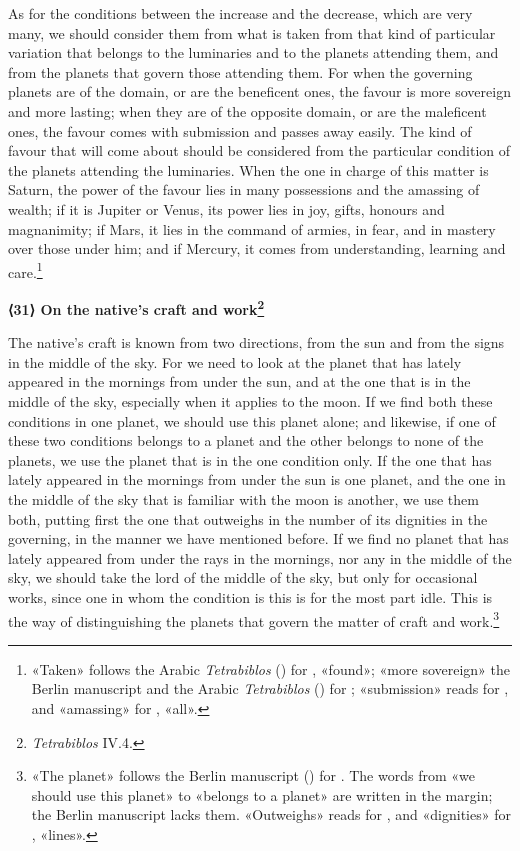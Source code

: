\documentclass[11pt]{article}
\newcommand{\Fol}[1]{\marginpar{\footnotesize\color{gray}f.\,#1}}
\newcommand{\ChapterHead}[4]{\par\needspace{8\baselineskip}\bigskip\pdfbookmark[1]{#1}{ch-#2}\hypertarget{EN-K#2}{}%
 {\large\bfseries\interlinepenalty=10000 #1#4{\normalfont\normalsize#3}\par}\nobreak\medskip}
\begin{document}
\par As for the conditions between the increase and the decrease, which are very many, we should consider them from what is taken from that kind of particular variation that belongs to the luminaries and to the planets attending them, and from the planets that govern those attending them. For when the governing planets are of the domain, or are the beneficent ones, the favour is more sovereign and more lasting; when they are of the opposite domain, or are the maleficent ones, the favour comes with submission and passes away easily. The kind of favour that will come about should be considered from the particular condition of the planets attending the luminaries. When the one in charge of this matter is Saturn, the power of the favour lies in many possessions and the amassing of wealth; if it is Jupiter or Venus, its power lies in joy, gifts, honours and magnanimity; if Mars, it lies in the command of armies, in fear, and in mastery over those under him; and if Mercury, it comes from understanding, learning and care.\footnote{«Taken» follows the Arabic \emph{Tetrabiblos} () for , «found»; «more sovereign» the Berlin manuscript and the Arabic \emph{Tetrabiblos} () for ; «submission» reads  for , and «amassing»  for , «all».}\par
\ChapterHead{{\mdseries ⟨}31{\mdseries ⟩} On the native's craft and work}{31}{}{\footnote{\emph{Tetrabiblos} IV.4.}}
\par \Fol{65r}The native's craft is known from two directions, from the sun and from the signs in the middle of the sky. For we need to look at the planet that has lately appeared in the mornings from under the sun, and at the one that is in the middle of the sky, especially when it applies to the moon. If we find both these conditions in one planet, we should use this planet alone; and likewise, if one of these two conditions belongs to a planet and the other belongs to none of the planets, we use the planet that is in the one condition only. If the one that has lately appeared in the mornings from under the sun is one planet, and the one in the middle of the sky that is familiar with the moon is another, we use them both, putting first the one that outweighs in the number of its dignities in the governing, in the manner we have mentioned before. If we find no planet that has lately appeared from under the rays in the mornings, nor any in the middle of the sky, we should take the lord of the middle of the sky, but only for occasional works, since one in whom the condition is this is for the most part idle. This is the way of distinguishing the planets that govern the matter of craft and work.\footnote{«The planet» follows the Berlin manuscript () for . The words from «we should use this planet» to «belongs to a planet» are written in the margin; the Berlin manuscript lacks them. «Outweighs» reads  for , and «dignities»  for , «lines».}\par
\end{document}

